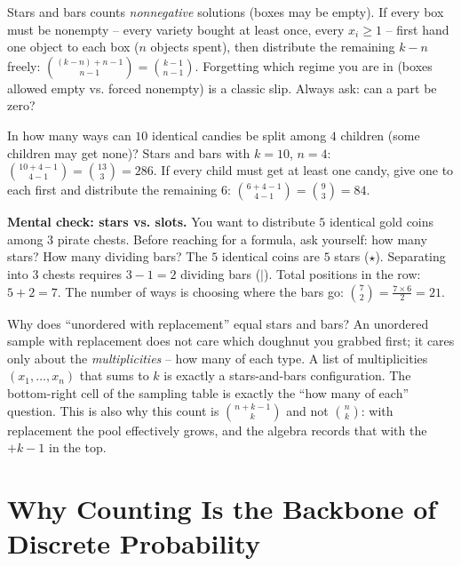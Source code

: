 \begin{trapbox}
Stars and bars counts \emph{nonnegative} solutions (boxes may be empty). If every box must
be nonempty -- every variety bought at least once, every $x_i \ge 1$ -- first hand one
object to each box ($n$ objects spent), then distribute the remaining $k - n$ freely:
$\binom{(k-n)+n-1}{n-1} = \binom{k-1}{n-1}$. Forgetting which regime you are in (boxes
allowed empty vs. forced nonempty) is a classic slip. Always ask: can a part be zero?
\end{trapbox}

\begin{example}
\label{ch2:ex-gifts}
In how many ways can $10$ identical candies be split among $4$ children (some children may
get none)? Stars and bars with $k=10$, $n=4$: $\binom{10+4-1}{4-1} = \binom{13}{3} = 286$.
If every child must get at least one candy, give one to each first and distribute the
remaining $6$: $\binom{6+4-1}{4-1} = \binom{9}{3} = 84$.
\end{example}

\begin{recoverybox}
\textbf{Mental check: stars vs. slots.} You want to distribute $5$ identical gold coins among
$3$ pirate chests. Before reaching for a formula, ask yourself: how many stars? How many
dividing bars? The $5$ identical coins are $5$ stars ($\star$). Separating into $3$ chests
requires $3 - 1 = 2$ dividing bars ($\mid$). Total positions in the row: $5 + 2 = 7$.
The number of ways is choosing where the bars go: $\binom{7}{2} = \frac{7 \times 6}{2} = 21$.
\end{recoverybox}

\begin{happeningbox}
Why does ``unordered with replacement'' equal stars and bars? An unordered sample with
replacement does not care which doughnut you grabbed first; it cares only about the
\emph{multiplicities} -- how many of each type. A list of multiplicities $(x_1,\dots,x_n)$
that sums to $k$ is exactly a stars-and-bars configuration. The bottom-right cell of the sampling table is exactly the ``how many
of each'' question. This is also why this count is $\binom{n+k-1}{k}$ and not
$\binom{n}{k}$: with replacement the pool effectively grows, and the algebra records that
with the $+k-1$ in the top.
\end{happeningbox}

\section{Why Counting Is the Backbone of Discrete Probability}
\label{ch2:backbone}

